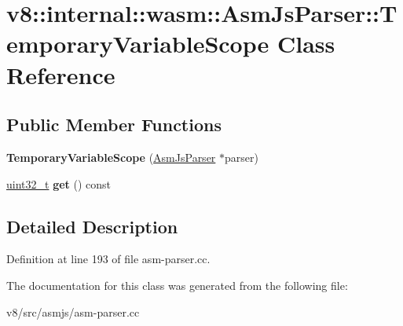 \hypertarget{classv8_1_1internal_1_1wasm_1_1AsmJsParser_1_1TemporaryVariableScope}{}\section{v8\+:\+:internal\+:\+:wasm\+:\+:Asm\+Js\+Parser\+:\+:Temporary\+Variable\+Scope Class Reference}
\label{classv8_1_1internal_1_1wasm_1_1AsmJsParser_1_1TemporaryVariableScope}
\subsection*{Public Member Functions}
\begin{DoxyCompactItemize}
\item 
\mbox{\label{classv8_1_1internal_1_1wasm_1_1AsmJsParser_1_1TemporaryVariableScope_ad2a93e33b671d1a5cc70be032e7192ee}} 
{\bfseries Temporary\+Variable\+Scope} (\mbox{\hyperlink{classv8_1_1internal_1_1wasm_1_1AsmJsParser}{Asm\+Js\+Parser}} $\ast$parser)
\item 
\mbox{\label{classv8_1_1internal_1_1wasm_1_1AsmJsParser_1_1TemporaryVariableScope_a504baef0549862d95c682ac2f0b362eb}} 
\mbox{\hyperlink{classuint32__t}{uint32\+\_\+t}} {\bfseries get} () const
\end{DoxyCompactItemize}


\subsection{Detailed Description}


Definition at line 193 of file asm-\/parser.\+cc.



The documentation for this class was generated from the following file\+:\begin{DoxyCompactItemize}
\item 
v8/src/asmjs/asm-\/parser.\+cc\end{DoxyCompactItemize}
